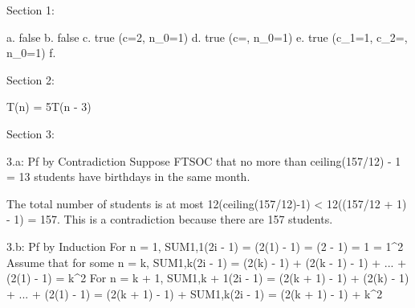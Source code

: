 Section 1:

a. false
b. false
c. true (c=2, n_0=1)
d. true (c=, n_0=1)
e. true (c_1=1, c_2=, n_0=1)
f. 










Section 2:

T(n) = 5T(n - 3)













Section 3:

3.a:
Pf by Contradiction
Suppose FTSOC that no more than ceiling(157/12) - 1 = 13 students have birthdays in the same month.

The total number of students is at most 12(ceiling(157/12)-1) < 12((157/12 + 1) - 1) = 157. This is a contradiction because there are 157 students.

3.b:
Pf by Induction
For n = 1, SUM{1,1}(2i - 1) = (2(1) - 1) = (2 - 1) = 1 = 1^2
Assume that for some n = k, SUM{1,k}(2i - 1) = (2(k) - 1) + (2(k - 1) - 1) + ... + (2(1) - 1) = k^2
For n = k + 1, SUM{1,k + 1}(2i - 1) = (2(k + 1) - 1) + (2(k) - 1) + ... + (2(1) - 1) = (2(k + 1) - 1) + SUM{1,k}(2i - 1) = (2(k + 1) - 1) + k^2

